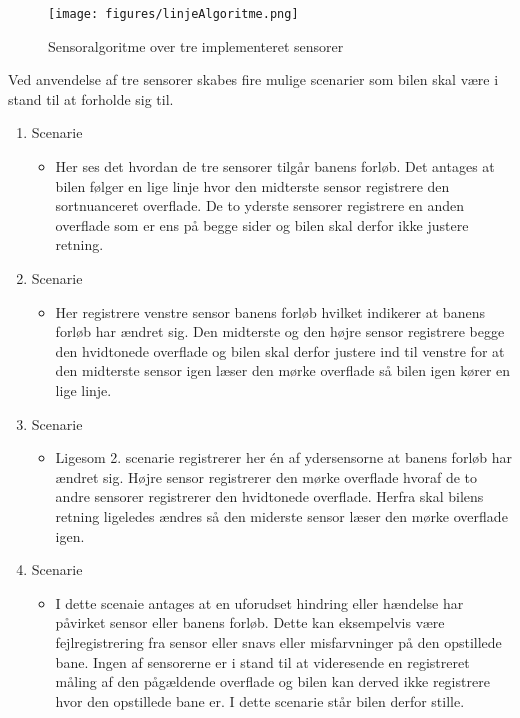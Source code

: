 \begin{figure}[h!]
  \centering
  \texttt{[image: figures/linjeAlgoritme.png]}
  \caption{Sensoralgoritme over tre implementeret sensorer}
\end{figure}

Ved anvendelse af tre sensorer skabes fire mulige scenarier som bilen skal være i stand til at forholde sig til.

\begin{enumerate}
   \item Scenarie
   \begin{itemize}
     \item Her ses det hvordan de tre sensorer tilgår banens forløb. Det antages at bilen følger en lige linje hvor den midterste sensor registrere den sortnuanceret overflade. De to yderste sensorer registrere en anden overflade som er ens på begge sider og bilen skal derfor ikke justere retning.
   \end{itemize}
   \item Scenarie
   \begin{itemize}
     \item Her registrere venstre sensor banens forløb hvilket indikerer at banens forløb har ændret sig. Den midterste og den højre sensor registrere begge den hvidtonede overflade og bilen skal derfor justere ind til venstre for at den midterste sensor igen læser den mørke overflade så bilen igen kører en lige linje. 
     \end{itemize}
        \item Scenarie
   \begin{itemize}
     \item Ligesom 2. scenarie registrerer her én af ydersensorne at banens forløb har ændret sig. Højre sensor registrerer den mørke overflade hvoraf de to andre sensorer registrerer den hvidtonede overflade. Herfra skal bilens retning ligeledes ændres så den miderste sensor læser den mørke overflade igen. 
   \end{itemize}
           \item Scenarie
   \begin{itemize}
     \item I dette scenaie antages at en uforudset hindring eller hændelse har påvirket sensor eller banens forløb. Dette kan eksempelvis være fejlregistrering fra sensor eller snavs eller misfarvninger på den opstillede bane. 
     \newline
     Ingen af sensorerne er i stand til at videresende en registreret måling af den pågældende overflade og bilen kan derved ikke registrere hvor den opstillede bane er. I dette scenarie står bilen derfor stille. 
   \end{itemize}
\end{enumerate}

